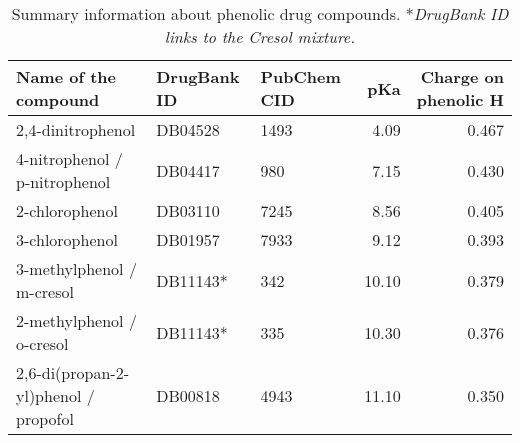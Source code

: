 \documentclass[oneside]{memoir}
\begin{document}
\begin{table}
\renewcommand\thetable{1}
\begin{tabular}{lllrr}
\toprule
\textbf{Name of the compound} & \textbf{DrugBank ID} & \textbf{PubChem CID} & \textbf{pKa} & \textbf{Charge on phenolic H}\\
\midrule
2,4-dinitrophenol &
DB04528 &
1493 &
4.09 &
0.467 \\
4-nitrophenol / p-nitrophenol &
DB04417 &
980 &
7.15 &
0.430 \\
2-chlorophenol &
DB03110 &
7245 &
8.56 &
0.405 \\
3-chlorophenol &
DB01957 &
7933 &
9.12 &
0.393 \\
3-methylphenol / m-cresol &
DB11143* &
342 &
10.10 &
0.379 \\
2-methylphenol / o-cresol &
DB11143*&
335 &
10.30 &
0.376 \\
2,6-di(propan-2-yl)phenol / propofol &
DB00818 &
4943 &
11.10 &
0.350 \\
\bottomrule
\end{tabular}

\caption{Summary information about phenolic drug compounds. *\textit{DrugBank ID links to the Cresol mixture.}}


\end{table}
\end{document}

